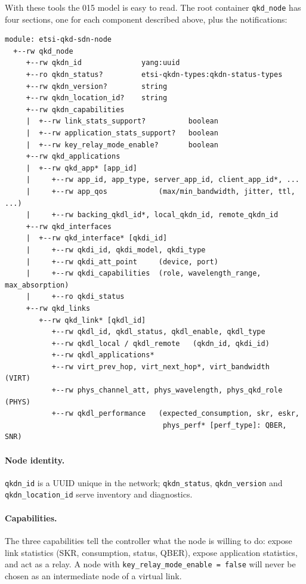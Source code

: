 With these tools the 015 model is easy to read. The root container
\texttt{qkd\_node} has four sections, one for each component described
above, plus the notifications:
\begin{lstlisting}
module: etsi-qkd-sdn-node
  +--rw qkd_node
     +--rw qkdn_id              yang:uuid
     +--ro qkdn_status?         etsi-qkdn-types:qkdn-status-types
     +--rw qkdn_version?        string
     +--rw qkdn_location_id?    string
     +--rw qkdn_capabilities
     |  +--rw link_stats_support?          boolean
     |  +--rw application_stats_support?   boolean
     |  +--rw key_relay_mode_enable?       boolean
     +--rw qkd_applications
     |  +--rw qkd_app* [app_id]
     |     +--rw app_id, app_type, server_app_id, client_app_id*, ...
     |     +--rw app_qos            (max/min_bandwidth, jitter, ttl, ...)
     |     +--rw backing_qkdl_id*, local_qkdn_id, remote_qkdn_id
     +--rw qkd_interfaces
     |  +--rw qkd_interface* [qkdi_id]
     |     +--rw qkdi_id, qkdi_model, qkdi_type
     |     +--rw qkdi_att_point     (device, port)
     |     +--rw qkdi_capabilities  (role, wavelength_range, max_absorption)
     |     +--ro qkdi_status
     +--rw qkd_links
        +--rw qkd_link* [qkdl_id]
           +--rw qkdl_id, qkdl_status, qkdl_enable, qkdl_type
           +--rw qkdl_local / qkdl_remote   (qkdn_id, qkdi_id)
           +--rw qkdl_applications*
           +--rw virt_prev_hop, virt_next_hop*, virt_bandwidth   (VIRT)
           +--rw phys_channel_att, phys_wavelength, phys_qkd_role (PHYS)
           +--rw qkdl_performance   (expected_consumption, skr, eskr,
                                     phys_perf* [perf_type]: QBER, SNR)
\end{lstlisting}

\paragraph{Node identity.}
\texttt{qkdn\_id} is a UUID unique in the network; \texttt{qkdn\_status},
\texttt{qkdn\_version} and \texttt{qkdn\_location\_id} serve inventory and
diagnostics.

\paragraph{Capabilities.}
The three capabilities tell the controller what the node is willing to do:
expose link statistics (SKR, consumption, status, QBER), expose
application statistics, and act as a relay. A node with
\texttt{key\_relay\_mode\_enable = false} will never be chosen as an
intermediate node of a virtual link.


